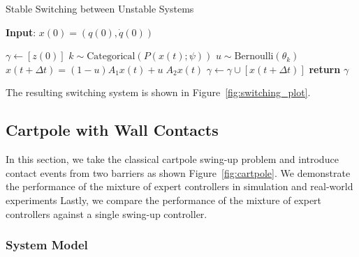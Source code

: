 \begin{algorithm}
      \caption{Stable Switching between Unstable Systems}
      \label{algo:switching_A1A2}
      \small
      \hspace*{\algorithmicindent} \textbf{Input}: $x(0) = (q(0), \dot{q}(0))$
      \begin{algorithmic}[1]
        \State $\gamma \leftarrow  [z(0)]$ 
              \State $k \sim \text{Categorical}(P(x(t); \psi))$ 
              \State $u \sim \text{Bernoulli}(\theta_k)$      
              \State $x(t+\Delta t) = (1-u)A_1x(t) + u \; A_2x(t) $
              \State $\gamma \leftarrow \gamma \cup [x(t+\Delta t)]$
            \EndFor
          \State \textbf{return} $\gamma$
      \end{algorithmic}
  \end{algorithm}
  
The resulting switching system is shown in Figure~\ref{fig:switching_plot}.

\subsection{Cartpole with Wall Contacts}


In this section, we take the classical cartpole swing-up problem and introduce
contact events from two barriers as shown Figure~\ref{fig:cartpole}. 
%
We demonstrate the performance of the mixture of expert controllers in
simulation and real-world experiments
%
Lastly, we compare the performance of the mixture of expert controllers against
a single swing-up controller. 


\subsubsection{System Model}
\label{sssec:cartpole_model}

